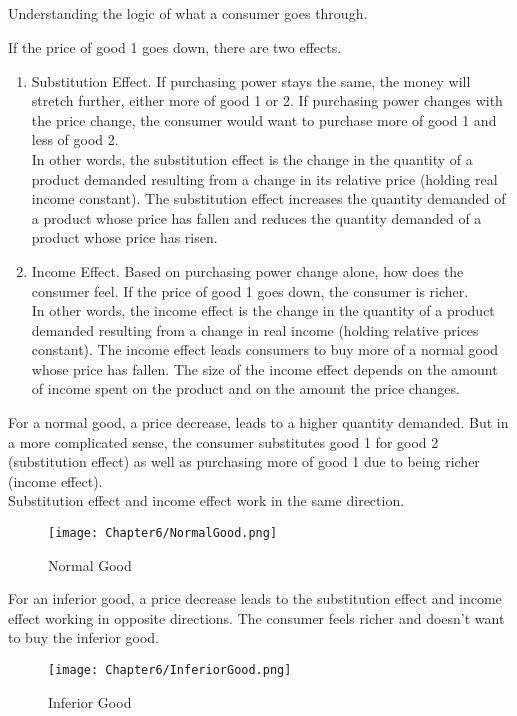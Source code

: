 \subsection{}
Understanding the logic of what a consumer goes through.
\par
If the price of good 1 goes down, there are two effects.
\begin{enumerate}
    \item Substitution Effect. If purchasing power stays the same, the money will stretch further, either more of good 1 or 2.
    If purchasing power changes with the price change, the consumer would want to purchase more of good 1 and less of good 2.\\
    In other words, the substitution effect is the change in the quantity of a product demanded resulting from a change in its relative price (holding real income constant).
    The substitution effect increases the quantity demanded of a product whose price has fallen and reduces the quantity demanded of a product whose price has risen.
    \item Income Effect. Based on purchasing power change alone, how does the consumer feel. If the price of good 1 goes down, the consumer is richer.\\
    In other words, the income effect is the change in the quantity of a product demanded resulting from a change in real income (holding relative prices constant).
    The income effect leads consumers to buy more of a normal good whose price has fallen. The size of the income effect depends on the amount of income spent on the product and on the amount the price changes.
\end{enumerate}
For a normal good, a price decrease, leads to a higher quantity demanded. But in a more complicated sense,
the consumer substitutes good 1 for good 2 (substitution effect) as well as purchasing more of good 1 due to being richer (income effect).\\
Substitution effect and income effect work in the same direction.
\begin{figure}[H]
    \centering
    \texttt{[image: Chapter6/NormalGood.png]}
    \caption{Normal Good}
    \label{fig:Normal_Good}
\end{figure}\par
For an inferior good, a price decrease leads to the substitution effect and income effect working in opposite directions.
The consumer feels richer and doesn't want to buy the inferior good.
\begin{figure}[H]
    \centering
    \texttt{[image: Chapter6/InferiorGood.png]}
    \caption{Inferior Good}
    \label{fig:Inferior_Good}
\end{figure}\par
